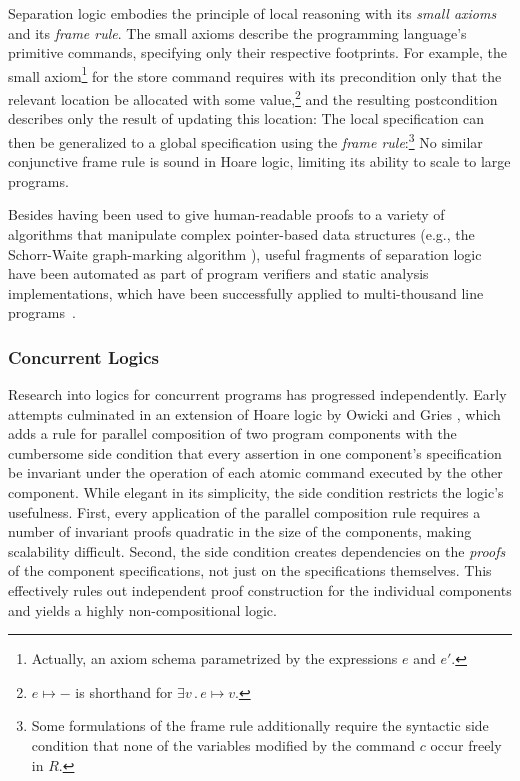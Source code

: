 \documentclass[11pt]{report}
\begin{document}
Separation logic embodies the principle of local reasoning with its \emph{small axioms} and its \emph{frame rule}. The small axioms describe the programming language's primitive commands, specifying only their respective footprints. For example, the small axiom\footnote{Actually, an axiom schema parametrized by the expressions $e$ and $e'$.} for the store command requires with its precondition only that the relevant location be allocated with some value,\footnote{$e \mapsto -$ is shorthand for $\exists v\,.\,e \mapsto v$.} and the resulting postcondition describes only the result of updating this location:  The local specification can then be generalized to a global specification using the \emph{frame rule}:\footnote{Some formulations of the frame rule additionally require the syntactic side condition that none of the variables modified by the command $c$ occur freely in $R$.}   No similar conjunctive frame rule is sound in Hoare logic, limiting its ability to scale to large programs.

Besides having been used to give human-readable proofs to a variety of algorithms that manipulate complex pointer-based data structures (e.g., the Schorr-Waite graph-marking algorithm \cite{Yang-thesis}), useful fragments of separation logic have been automated as part of program verifiers and static analysis implementations, which have been successfully applied to multi-thousand line programs~\cite{DBLP:conf/fmco/BerdineCO05,DBLP:conf/cav/YangLBCCDO08}.

\subsubsection{Concurrent Logics}

Research into logics for concurrent programs has progressed independently. Early attempts culminated in an extension of Hoare logic by Owicki and Gries \cite{DBLP:journals/cacm/OwickiG76}, which adds a rule for parallel composition of two program components with the cumbersome side condition that every assertion in one component's specification be invariant under the operation of each atomic command executed by the other component. While elegant in its simplicity, the side condition restricts the logic's usefulness. First, every application of the parallel composition rule requires a number of invariant proofs quadratic in the size of the components, making scalability difficult. Second, the side condition creates dependencies on the \emph{proofs} of the component specifications, not just on the specifications themselves. This effectively rules out independent proof construction for the individual components and yields a highly non-compositional logic.
\end{document}
